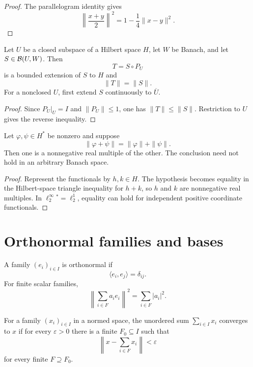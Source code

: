 \begin{proof}
The parallelogram identity gives
\[
  \left\|\frac{x+y}{2}\right\|^2
  =1-\frac14\|x-y\|^2.
\]
\end{proof}

\begin{notetheorem}
Let $U$ be a closed subspace of a Hilbert space $H$, let $W$ be Banach, and
let $S\in\mathcal{B}(U,W)$.  Then
\[
  T=S\circ P_U
\]
is a bounded extension of $S$ to $H$ and
\[
  \|T\|=\|S\|.
\]
For a nonclosed $U$, first extend $S$ continuously to $\overline U$.
\end{notetheorem}

\begin{proof}
Since $P_U|_U=I$ and $\|P_U\|\le1$, one has
$\|T\|\le\|S\|$.  Restriction to $U$ gives the reverse inequality.
\end{proof}

\begin{noteexercise}
Let $\varphi,\psi\in H^*$ be nonzero and suppose
\[
  \|\varphi+\psi\|=\|\varphi\|+\|\psi\|.
\]
Then one is a nonnegative real multiple of the other.  The conclusion need not
hold in an arbitrary Banach space.
\end{noteexercise}

\begin{proof}
Represent the functionals by $h,k\in H$.  The hypothesis becomes equality in
the Hilbert-space triangle inequality for $h+k$, so $h$ and $k$ are
nonnegative real multiples.  In $\ell^\infty_2{}^*=\ell^1_2$, equality can
hold for independent positive coordinate functionals.
\end{proof}

\section{Orthonormal families and bases}

\begin{notedefinition}
A family $(e_i)_{i\in I}$ is orthonormal if
\[
  \langle e_i,e_j\rangle=\delta_{ij}.
\]
For finite scalar families,
\[
  \left\|\sum_{i\in F}a_ie_i\right\|^2
  =\sum_{i\in F}|a_i|^2.
\]
\end{notedefinition}

\begin{notedefinition}
For a family $(x_i)_{i\in I}$ in a normed space, the unordered sum
$\sum_{i\in I}x_i$ converges to $x$ if for every $\varepsilon>0$ there is a
finite $F_0\subseteq I$ such that
\[
  \left\|x-\sum_{i\in F}x_i\right\|<\varepsilon
\]
for every finite $F\supseteq F_0$.
\end{notedefinition}

